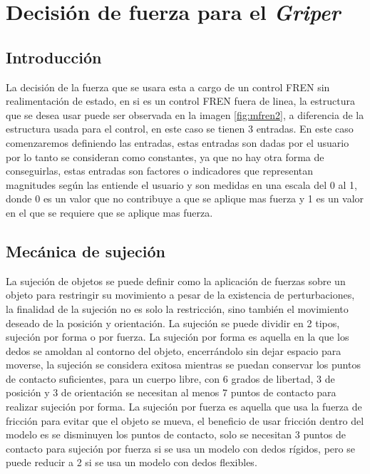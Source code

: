     \chapter{Decisión de fuerza para el \textit{Griper}}
    \section{Introducción}
    La decisión de la fuerza que se usara esta a cargo de un control FREN sin realimentación de estado, en si es un control FREN fuera de linea, la estructura que se desea usar puede ser observada en la imagen \ref{fig:mfren2}, a diferencia de la estructura usada para el control, en este caso se tienen 3 entradas. %
    En este caso comenzaremos definiendo las entradas, estas entradas son dadas por el usuario por lo tanto se consideran como constantes, ya que no hay otra forma de conseguirlas, estas entradas son factores o indicadores que representan magnitudes según las entiende el usuario y son medidas en una escala del 0 al 1, donde 0 es un valor que no contribuye a que se aplique mas fuerza y 1 es un valor en el que se requiere que se aplique mas fuerza.
    
    \section{Mecánica de sujeción}
    
    La sujeción de objetos se puede definir como la aplicación de fuerzas sobre un objeto para restringir su movimiento a pesar de la existencia de perturbaciones, la finalidad de la sujeción no es solo la restricción, sino también el movimiento deseado de la posición y orientación.
    La sujeción se puede dividir en 2 tipos, sujeción por forma o por fuerza. La sujeción por forma es aquella en la que los dedos se amoldan al contorno del objeto, encerrándolo sin dejar espacio para moverse, la sujeción se considera exitosa mientras se puedan conservar los puntos de contacto suficientes, para un cuerpo libre, con 6 grados de libertad, 3 de posición y 3 de orientación se necesitan al menos 7 puntos de contacto para realizar sujeción por forma.
    La sujeción por fuerza es aquella que usa la fuerza de fricción para evitar que el objeto se mueva, el beneficio de usar fricción dentro del modelo es se disminuyen los puntos de contacto, solo se necesitan 3 puntos de contacto para sujeción por fuerza si se usa un modelo con dedos rígidos, pero se puede reducir a 2 si se usa un modelo con dedos flexibles.
    

